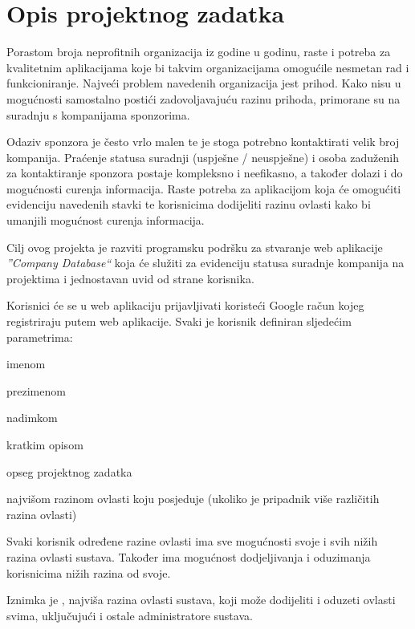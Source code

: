 \chapter{Opis projektnog zadatka}
		
		
		
		{Porastom broja neprofitnih organizacija iz godine u godinu, raste i potreba za kvalitetnim aplikacijama koje bi takvim organizacijama omogućile nesmetan rad i funkcioniranje. Najveći problem navedenih organizacija jest prihod. Kako nisu u mogućnosti samostalno postići zadovoljavajuću razinu prihoda, primorane su na suradnju s kompanijama sponzorima.}

		{Odaziv sponzora je često vrlo malen te je stoga potrebno kontaktirati velik broj kompanija. Praćenje statusa suradnji (uspješne / neuspješne) i osoba zaduženih za kontaktiranje sponzora postaje kompleksno i neefikasno, a također dolazi i do mogućnosti curenja informacija. Raste potreba za aplikacijom koja će omogućiti evidenciju navedenih stavki te korisnicima dodijeliti razinu ovlasti kako bi umanjili mogućnost curenja informacija.}

		{Cilj ovog projekta je razviti programsku podršku za stvaranje web aplikacije \textit{”Company Database“} koja će služiti za evidenciju statusa suradnje kompanija na projektima i jednostavan uvid od strane  korisnika.}\vspace{0.2cm}

		{Korisnici će se u web aplikaciju prijavljivati koristeći Google račun kojeg registriraju putem web aplikacije. Svaki je korisnik definiran sljedećim parametrima:}
		\begin{packed_item}
			\item {imenom}
			\item {prezimenom}
			\item {nadimkom}
			\item {kratkim opisom}
			\item {opseg projektnog zadatka}
			\item {najvišom razinom ovlasti koju posjeduje (ukoliko je pripadnik više različitih razina ovlasti)}
		\end{packed_item}

		{Svaki korisnik određene razine ovlasti ima sve mogućnosti svoje i svih nižih razina ovlasti sustava. Također ima mogućnost dodjeljivanja i oduzimanja  korisnicima nižih razina od svoje.}

		{Iznimka je , najviša razina ovlasti sustava, koji može dodijeliti i oduzeti ovlasti svima, uključujući i ostale administratore sustava.}\\
\\


